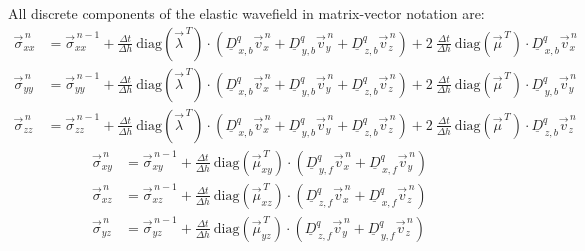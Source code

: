 \documentclass[pdftex,a4paper,parskip,listof=totoc,bibliography=totoc,onehalfspacing,12pt]{scrreprt}
\begin{document}
All discrete components of the elastic wavefield in matrix-vector notation are: 
\begin{align*}
	\vec{\sigma}_{xx}^{\,n} &= \vec{\sigma}_{xx}^{\,n-1} + \frac{\Delta t}{\Delta h}~ \mathrm{diag} \left( \vec{\lambda}^{\,T} \right) \cdot \left( \underline{D}_{\,x,b}^q \vec{v}_x^{\,n} +\underline{D}_{\,y,b}^q \vec{v}_y^{\,n} + \underline{D}_{\,z,b}^q \vec{v}_z^{\,n} \right) + 2~ \frac{\Delta t}{\Delta h} ~\mathrm{diag} \left( \vec{\mu}^{\,T} \right) \cdot \underline{D}_{\,x,b}^q \vec{v}_x^{\,n}\\
	\vec{\sigma}_{yy}^{\,n} &= \vec{\sigma}_{yy}^{\,n-1} + \frac{\Delta t}{\Delta h}~ \mathrm{diag} \left( \vec{\lambda}^{\,T} \right) \cdot \left( \underline{D}_{\,x,b}^q \vec{v}_x^{\,n} +\underline{D}_{\,y,b}^q \vec{v}_y^{\,n} + \underline{D}_{\,z,b}^q \vec{v}_z^{\,n} \right) + 2~ \frac{\Delta t}{\Delta h} ~\mathrm{diag} \left( \vec{\mu}^{\,T} \right) \cdot \underline{D}_{\,y,b}^q \vec{v}_y^{\,n}\\
	\vec{\sigma}_{zz}^{\,n} &= \vec{\sigma}_{zz}^{\,n-1} + \frac{\Delta t}{\Delta h}~ \mathrm{diag} \left( \vec{\lambda}^{\,T} \right) \cdot \left( \underline{D}_{\,x,b}^q \vec{v}_x^{\,n} +\underline{D}_{\,y,b}^q \vec{v}_y^{\,n} + \underline{D}_{\,z,b}^q \vec{v}_z^{\,n} \right) + 2~ \frac{\Delta t}{\Delta h} ~\mathrm{diag} \left( \vec{\mu}^{\,T} \right) \cdot \underline{D}_{\,z,b}^q \vec{v}_z^{\,n}
\end{align*}
\begin{align*}
	\vec{\sigma}_{xy}^{\,n} &= \vec{\sigma}_{xy}^{\,n-1} + \frac{\Delta t}{\Delta h}~ \mathrm{diag} \left( \vec{\mu}_{xy}^{\,T} \right) \cdot \left( \underline{D}_{\,y,f}^q \vec{v}_x^{\,n} + \underline{D}_{\,x,f}^q \vec{v}_y^{\,n} \right)\\
	\vec{\sigma}_{xz}^{\,n} &= \vec{\sigma}_{xz}^{\,n-1} + \frac{\Delta t}{\Delta h}~ \mathrm{diag} \left( \vec{\mu}_{xz}^{\,T} \right) \cdot \left( \underline{D}_{\,z,f}^q \vec{v}_x^{\,n} + \underline{D}_{\,x,f}^q \vec{v}_z^{\,n} \right)\\
	\vec{\sigma}_{yz}^{\,n} &= \vec{\sigma}_{yz}^{\,n-1} + \frac{\Delta t}{\Delta h}~ \mathrm{diag} \left( \vec{\mu}_{yz}^{\,T} \right) \cdot \left( \underline{D}_{\,z,f}^q \vec{v}_y^{\,n} + \underline{D}_{\,y,f}^q \vec{v}_z^{\,n} \right)
\end{align*}
\end{document}
